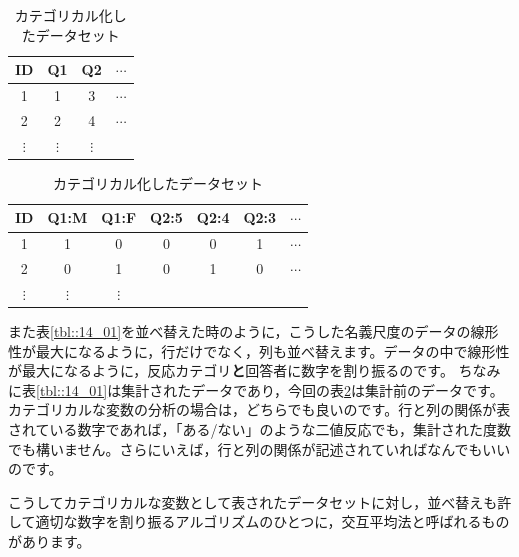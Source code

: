 \documentclass{ltjsbook}
\begin{document}
\begin{table}[ht]
	\begin{minipage}[t]{.30\textwidth}
		\begin{center}
			\caption{一般的なデータセット}
			\begin{tabular}{cccc}
				ID       & Q1       & Q2       & $\cdots$ \\\hline
				1        & 1        & 3        & $\cdots$ \\
				2        & 2        & 4        & $\cdots$ \\
				$\vdots$ & $\vdots$ & $\vdots$ &          \\\hline
			\end{tabular}
		\end{center}
		\label{tbl::14_04}
	\end{minipage}
	\hfill
	\begin{minipage}[t]{.60\textwidth}
		\begin{center}
			\caption{カテゴリカル化したデータセット}
			\begin{tabular}{ccccccc}
				ID       & Q1:M      & Q1:F     & Q2:5 & Q2:4 & Q2:3 & $\cdots$ \\\hline
				1        & 1         & 0        & 0    & 0    & 1    & $\cdots$ \\
				2        & 0         & 1        & 0    & 1    & 0    & $\cdots$ \\
				$\vdots$ & $\vdots $ & $\vdots$ &                               \\\hline
			\end{tabular}
		\end{center}
		\label{tbl::14_05}
	\end{minipage}
\end{table}

また表\ref{tbl::14_01}を並べ替えた時のように，こうした名義尺度のデータの線形性が最大になるように，行だけでなく，列も並べ替えます。データの中で線形性が最大になるように，反応カテゴリ\textbf{と}回答者に数字を割り振るのです。
ちなみに表\ref{tbl::14_01}は集計されたデータであり，今回の表\ref{tbl::14_05}は集計前のデータです。カテゴリカルな変数の分析の場合は，どちらでも良いのです。行と列の関係が表されている数字であれば，「ある/ない」のような二値反応でも，集計された度数でも構いません。さらにいえば，行と列の関係が記述されていればなんでもいいのです。

こうしてカテゴリカルな変数として表されたデータセットに対し，並べ替えも許して適切な数字を割り振るアルゴリズムのひとつに，交互平均法と呼ばれるものがあります。
\end{document}

